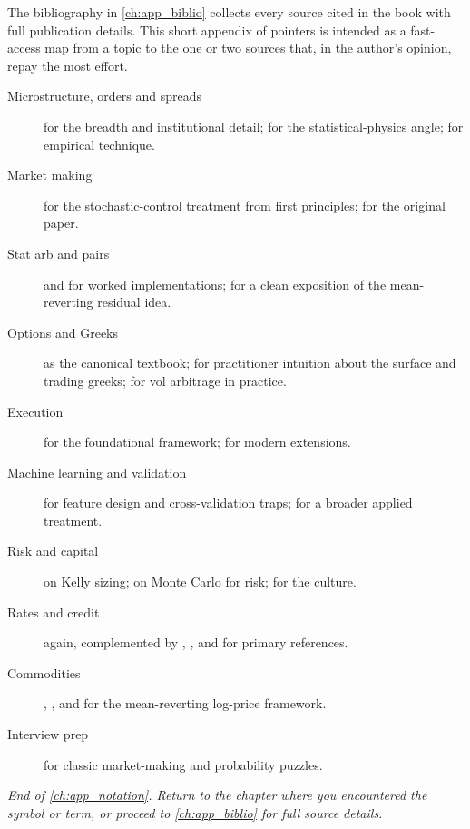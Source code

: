 The bibliography in \cref{ch:app_biblio} collects every source
cited in the book with full publication details. This short appendix of
pointers is intended as a fast-access map from a topic to the one or
two sources that, in the author's opinion, repay the most effort.

\begin{description}
\item[Microstructure, orders and spreads] \citeHarris{} for the breadth
and institutional detail; \citeBouchaud{} for the statistical-physics
angle; \citeHasbrouck{} for empirical technique.
\item[Market making] \citeCartea{} for the stochastic-control treatment
from first principles; \citeAS{} for the original paper.
\item[Stat arb and pairs] \citeChan{} and \citeChanQT{} for worked
implementations; \citeAL{} for a clean exposition of the mean-reverting
residual idea.
\item[Options and Greeks] \citeHull{} as the canonical textbook;
\citeNatenberg{} for practitioner intuition about the surface and
trading greeks; \citeSinclair{} for vol arbitrage in practice.
\item[Execution] \citeAC{} for the foundational framework;
\citeCartea{} for modern extensions.
\item[Machine learning and validation] \citeAFML{} for feature design
and cross-validation traps; \citeJansen{} for a broader applied
treatment.
\item[Risk and capital] \citeThorp{} on Kelly sizing; \citeGlasserman{}
on Monte Carlo for risk; \citeDerman{} for the culture.
\item[Rates and credit] \citeHull{} again, complemented by
\citeBlackSF{}, \citeHW{}, and \citeBGM{} for primary references.
\item[Commodities] \citeSchwartz{}, \citeGibsonSchwartz{}, and
\citeSchwartzSmith{} for the mean-reverting log-price framework.
\item[Interview prep] \citeGreenBook{} for classic market-making and
probability puzzles.
\end{description}

\medskip
\noindent\emph{End of \cref{ch:app_notation}. Return to the chapter where
you encountered the symbol or term, or proceed to \cref{ch:app_biblio}
for full source details.}

